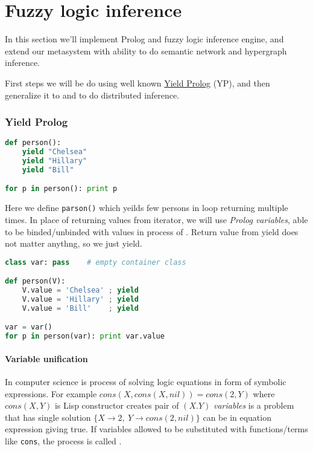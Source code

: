 \part{Fuzzy logic inference}

In this section we'll implement Prolog and fuzzy logic inference engine, and
extend our metasystem with ability to do semantic network and hypergraph
inference.

First steps we will be do using well known
\href{http://yieldprolog.sourceforge.net/}{Yield Prolog} (YP), and then
generalize it to  and  to do
distributed inference.

\section{Yield Prolog}

\begin{lstlisting}[language=Python]
def person():
    yield "Chelsea"
    yield "Hillary"
    yield "Bill"

for p in person(): print p
\end{lstlisting}
Here we define \verb|parson()|  which yeilds few
persons in loop returning  multiple times. In place of
returning values from iterator, we will use \emph{Prolog variables}, able to be
binded/unbinded with values in process of . Return value from
yield does not matter anythng, so we just yield.

\begin{lstlisting}[language=Python]
class var: pass    # empty container class

def person(V):
    V.value = 'Chelsea' ; yield
    V.value = 'Hillary' ; yield
    V.value = 'Bill'	; yield

var = var()
for p in person(var): print var.value
\end{lstlisting}

\subsection{Variable unification}

In computer science  is process of solving logic equations in
form of symbolic expressions. For example $cons(X,cons(X,nil)) = cons(2,Y)$
where $cons(X,Y)$ is Lisp constructor creates pair of $(X.Y)$ \emph{variables}
is a  problem that has single solution
$\{X\rightarrow 2,\ Y\rightarrow cons(2,nil)\}$ can be  in
equation expression giving true. If variables allowed to be substituted with
functions/terms like \verb|cons|, the process is called .

